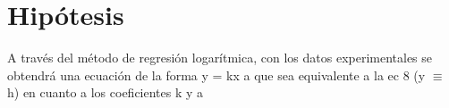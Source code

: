 \section{Hipótesis}
A través del método de regresión logarítmica, con los datos experimentales se obtendrá una ecuación de
la forma y = kx a que sea equivalente a la ec 8 (y $\equiv$ h) en cuanto a los coeficientes k y a
